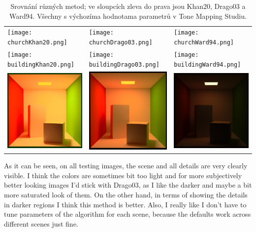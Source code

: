 \documentclass[11pt,a4paper,oneside]{article}
\begin{document}
\begin{table}[h]
    \centering
    \caption{Srovnání různých metod; ve sloupcích zleva do prava jsou Khan20,
    Drago03 a Ward94. Všechny s výchozíma hodnotama parametrů v Tone Mapping
    Studiu.}
    \label{tab:method-comp}
    \begin{tabular}{lll}
        \texttt{[image: churchKhan20.png]} &
        \texttt{[image: churchDrago03.png]} &
        \texttt{[image: churchWard94.png]} \\
    \texttt{[image: buildingKhan20.png]} &
        \texttt{[image: buildingDrago03.png]} &
        \texttt{[image: buildingWard94.png]}\\
    \includegraphics[width=.33\linewidth,valign=m]{cornell_boxKhan20.png} &
        \includegraphics[width=.33\linewidth,valign=m]{cornell_boxDrago03.png} &
        \includegraphics[width=.33\linewidth,valign=m]{cornell_boxWard94.png}\\
    \end{tabular}
\end{table}


As it can be seen, on all testing images, the scene and all details are very
clearly visible. I think the colors are sometimes bit too light and for more
subjectively better looking images I'd stick with Drago03, as I like the darker and maybe a bit more saturated look of them.
On the other hand, in terms of showing the details in darker regions I think this method is
better.
Also, I really like I don't have to tune parameters of the algorithm for each
scene, because the defaults work across different scenes just fine.
\end{document}
